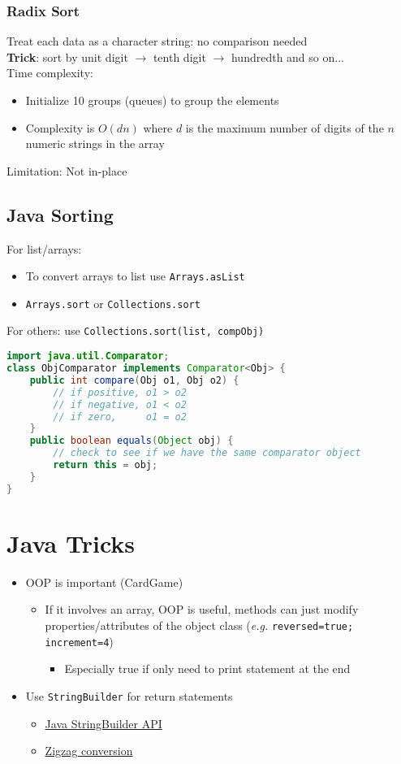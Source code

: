 \documentclass{article}
\newcommand{\eg}[0]{\textit{e.g. }}
\begin{document}
\begin{multicols}{2}
\subsubsection{Radix Sort}
Treat each data as a character string: no comparison needed\\
\textbf{Trick}: sort by unit digit $\rightarrow$ tenth digit $\rightarrow$ hundredth and so on...\\
Time complexity:
\begin{itemize}
	\item Initialize 10 groups (queues) to group the elements
	\item Complexity is $O(dn)$ where $d$ is the maximum number of digits of the $n$ numeric strings in the array
\end{itemize}
Limitation: Not in-place
\subsection{Java Sorting}
For list/arrays:
\begin{itemize}
	\item To convert arrays to list use \texttt{Arrays.asList}
	\item \texttt{Arrays.sort} or \texttt{Collections.sort}
\end{itemize}
For others: use \texttt{Collections.sort(list, compObj)}
\begin{lstlisting}[language=Java]
import java.util.Comparator;
class ObjComparator implements Comparator<Obj> {
	public int compare(Obj o1, Obj o2) {
		// if positive, o1 > o2
		// if negative, o1 < o2
		// if zero,     o1 = o2
	}
    public boolean equals(Object obj) {
    	// check to see if we have the same comparator object
    	return this = obj;
    }
}
\end{lstlisting}
\section{Java Tricks}
\begin{itemize}
	\item OOP is important (CardGame)
	\begin{itemize}
		\item If it involves an array, OOP is useful, methods can just modify properties/attributes of the object class (\eg \texttt{reversed=true; increment=4})
		\begin{itemize}
			\item Especially true if only need to print statement at the end
		\end{itemize}
	\end{itemize}
	\item Use \texttt{StringBuilder} for return statements
	\begin{itemize}
		\item \href{https://docs.oracle.com/javase/7/docs/api/java/lang/StringBuilder.html}{Java StringBuilder API}
		\item \href{https://leetcode.com/problems/zigzag-conversion/solution/}{Zigzag conversion}
	\end{itemize}

\end{itemize}
\end{multicols}
\end{document}
